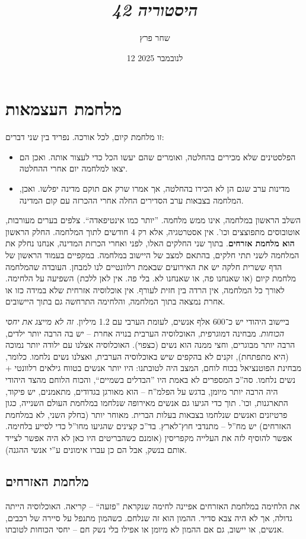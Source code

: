 \documentclass[]{../../../../tex/classes/styledArticle}
\author{שחר פרץ}
\title{\textit{היסטוריה 42}}
\date{12 לנובמבר 2025}
\begin{document}
	\maketitle
	\section*{מלחמת העצמאות}
	זו מלחמת קיום, לכל אורכה. נפריד בין שני דברים: 
	\begin{itemize}
		\item הפלסטינים שלא מכירים בהחלטה, ואומרים שהם יעשו הכל כדי לעצור אותה. ואכן הם יצאו למלחמה יום אחרי ההחלטה. 
		\item מדינות ערב שגם הן לא הכירו בהחלטה, אך אמרו שרק אם תוקם מדינה יפלשו. ואכן, המלחמה בצבאות ערב הסדירים החלה אחרי ההכרזה עם קום המדינה. 
	\end{itemize}
	השלב הראשון במלחמה, אינו ממש מלחמה. ''יותר כמו אינטיפאדה``. צלפים בערים מעורבות, אוטובוסים מתפוצצים וכו'. אין אסטרטגיה, אלא רק 4 חודשים לתוך המלחמה. החלק הראשון \textbf{הוא מלחמת אזרחים}. בתוך שני החלקים האלו, לפני ואחרי הכרזת המדינה, אנחנו נחלק את המלחמה לשני תתי חלקים, בהתאם למצב של היישוב במלחמה. במקפיים בעמוד הראשון של הדף ששרית חלקה יש את האירועים שבאמת רלוונטיים לנו למבחן. 
	העובדה שהמלחמה מלחמת קיום (או שאנחנו פה, או שאנחנו לא. בלי פה. אין לאן ללכת) השפיעה על הלחימה. לאורך כל המלחמה, אין הרדה בין חזית לעורף. אין אוכלוסיה אזרחית שלא במידה כזו או אחרת נמצאה בתוך המלחמה, והלחימה התרחשה גם בתוך היישובים. 
	
	ביישוב היהודי יש כ־600 אלף אנשים, לעומת הערבי עם 1.2 מיליון. \textit{זה לא מייצג את יחסי הכוחות}. מבחינה דמוגרפית, האוכלוסיה הערבית בנויה אחרת – יש בה הרבה יותר ילדים, הרבה יותר מבוגרים, וחצי ממנה הוא נשים (כצפוי). האוכלוסיה אצלנו עם ילודה יותר נמוכה (היא מתפתחת), זקנים לא בהקפים שיש באוכלוסיה הערבית, ואצלנו נשים נלחמו. כלומר, מבחינת הפוטנציאל בכוח לוחם, המצב היה לטובתנו: היו יותר אנשים בטווח גילאים רלוונטי + נשים נלחמו. סה''כ המספרים לא באמת היו ''הבדלים בשמיים``, והכוח הלוחם מהצד היהודי היה הרבה יותר מיומן, בדגש על הפלמ''ח – הוא מאורגן בגדודים, מתאמנים, יש פיקוד, התארגנות, וכו'. תוך כדי הגיעו גם אנשים מאירופה שנלחמו במלחמת העולם השנייה, כגון פרטיזנים ואנשים שנלחמו בצבאות בעלות הברית. מאוחר יותר (בחלק השני, לא במלחמת האזרחים) יש מח''ל – מתנדבי חוץ־לארץ. בד''כ קצינים שהגיעו מחו''ל כדי לסייע בלחימה. אפשר להוסיף לזה את העלייה מקפריסין (אומנם כשהבריטים היו כאן לא היה אפשר לצייד אותם בנשק, אבל הם כן עברו אימונים ע''י אנשי ההגנה). 
	
	
	\subsection*{מלחמת האזרחים}
	את הלחימה במלחמת האזרחים אפיינה לחימה שנקראת ''פזעה`` – קריאה. האוכלוסיה הייתה גדולה, אך לא היה צבא סדיר. ההמון הוא זה שנלחם. כשהמון מתנפל על סיירה של רכבים, אנשים, או יישוב, גם אם ההמון לא מיומן או אפילו בלי נשק חם – יחסי הכוחות לטובתו. 
	
\end{document}
